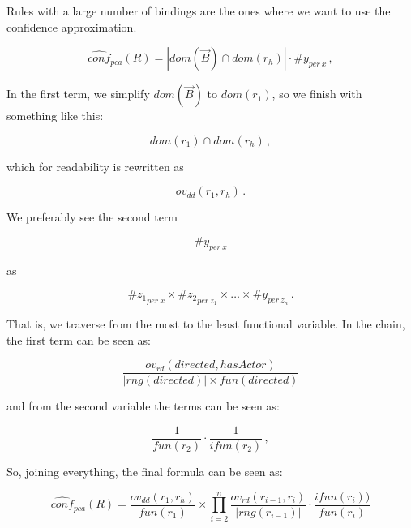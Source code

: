 \documentclass{article}
\newcommand{\body}{\vec{B}}
\begin{document}
Rules with a large number of bindings are the ones where we want to use the
confidence approximation.

\begin{equation}
    \label{eq:approx_stand_conf}
    \widehat{conf}_{pca}(R) = | dom(\body) \cap dom(r_h) | \cdot \# y_{per\ x}\,,
\end{equation}

In the first term, we simplify $dom(\body)$ to $dom(r_1)$, so we finish with
something like this:

\begin{equation*}
    dom(r_1) \cap dom(r_h)\,,
\end{equation*}

\noindent which for readability is rewritten as

\begin{equation*}
    ov_{dd}(r_1, r_h)\,.
\end{equation*}

\noindent We preferably see the second term

\begin{equation*}
    \#y_{per\ x}
\end{equation*}

\noindent as

\begin{equation*}
    \#{z_1}_{per\ x} \times \#{z_2}_{per\ z_1} \times \ldots \times \#y_{per\ z_n}\,.
\end{equation*}

\noindent That is, we traverse from the most to the least functional variable.
In the chain, the first term can be seen as:

\begin{equation*}
    \dfrac{ov_{rd}(directed, hasActor)}{|rng(directed)| \times fun(directed)}
\end{equation*}

\noindent and from the second variable the terms can be seen as:

\begin{equation*}
    \dfrac{1}{fun(r_2)} \cdot \dfrac{1}{ifun(r_2)} \,,
\end{equation*}

So, joining everything, the final formula can be seen as:

\begin{equation}
    \label{eq:approx_stand_conf_general}
    \widehat{conf}_{pca}(R) = \dfrac{ov_{dd}(r_1, r_h)}{fun(r_1)}
    \times
    \prod_{i=2}^{n} \dfrac{ov_{rd}(r_{i-1}, r_i)}{|rng(r_{i-1})|} \cdot \dfrac{ifun(r_i))}{fun(r_i)}
\end{equation}
\end{document}
